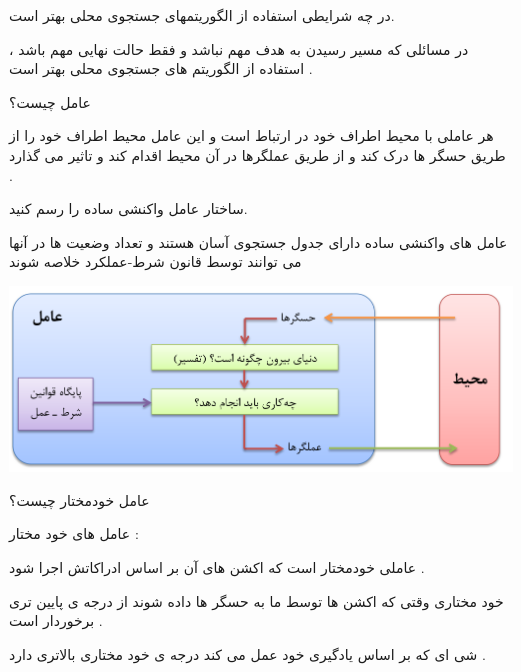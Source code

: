 \documentclass[12pt]{article}
\begin{document}
\vspace{20pt}
\noindent
در چه شرایطی استفاده از الگوریتمهای جستجوی محلی بهتر است.



\begin{tcolorbox}
در مسائلی که مسیر رسیدن به هدف مهم نباشد و فقط حالت نهایی مهم باشد ، استفاده از الگوریتم های جستجوی محلی بهتر است .
\end{tcolorbox}






\newpage
\vspace{20pt}
\noindent
عامل چیست؟


\begin{tcolorbox}
هر عاملی با محیط اطراف خود در ارتباط است و این عامل محیط  اطراف خود را از طریق حسگر ها درک کند و از طریق عملگرها در آن محیط اقدام کند و تاثیر می گذارد .
\end{tcolorbox}




\vspace{20pt}
\noindent
ساختار عامل واکنشی ساده را رسم کنید.


\begin{tcolorbox}
عامل های واکنشی ساده دارای جدول جستجوی آسان هستند و تعداد وضعیت ها در آنها می توانند توسط قانون شرط-عملکرد خلاصه شوند 
\end{tcolorbox}

\begin{center}
	\includegraphics[scale=0.6]{./Untitled.png}
\end{center}


\vspace{20pt}
\noindent
عامل خودمختار چیست؟


\begin{tcolorbox}
\noindent
عامل های خود مختار : 

\noindent
عاملی خودمختار است که اکشن های آن بر اساس ادراکاتش اجرا شود . 

\noindent
خود مختاری وقتی که اکشن ها توسط ما به حسگر ها داده شوند از درجه ی پایین تری برخوردار است .

\noindent
شی ای که بر اساس یادگیری خود عمل می کند درجه ی خود 
مختاری بالاتری دارد .
\end{tcolorbox}
\end{document}
